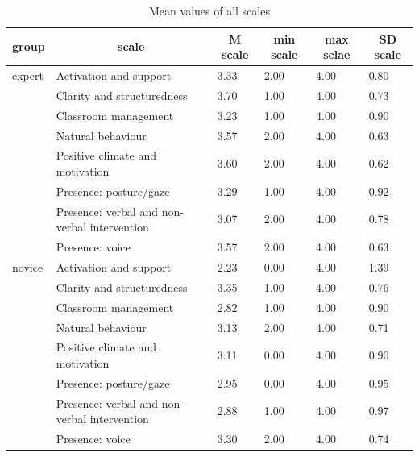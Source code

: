 \documentclass[
  english,
  man,floatsintext]{apa6}
\begin{document}
\begin{table}[h]

\begin{center}
\begin{threeparttable}

\caption{\label{tab:table all scales}Mean values of all scales}

\small{

\begin{tabular}{llllll}
\toprule
group & \multicolumn{1}{c}{scale} & \multicolumn{1}{c}{M scale} & \multicolumn{1}{c}{min scale} & \multicolumn{1}{c}{max sclae} & \multicolumn{1}{c}{SD scale}\\
\midrule
expert & Activation and support & 3.33 & 2.00 & 4.00 & 0.80\\
 & Clarity and structuredness & 3.70 & 1.00 & 4.00 & 0.73\\
 & Classroom management & 3.23 & 1.00 & 4.00 & 0.90\\
 & Natural behaviour & 3.57 & 2.00 & 4.00 & 0.63\\
 & Positive climate and motivation & 3.60 & 2.00 & 4.00 & 0.62\\
 & Presence: posture/gaze & 3.29 & 1.00 & 4.00 & 0.92\\
 & Presence: verbal and non-verbal intervention & 3.07 & 2.00 & 4.00 & 0.78\\
 & Presence: voice & 3.57 & 2.00 & 4.00 & 0.63\\
novice & Activation and support & 2.23 & 0.00 & 4.00 & 1.39\\
 & Clarity and structuredness & 3.35 & 1.00 & 4.00 & 0.76\\
 & Classroom management & 2.82 & 1.00 & 4.00 & 0.90\\
 & Natural behaviour & 3.13 & 2.00 & 4.00 & 0.71\\
 & Positive climate and motivation & 3.11 & 0.00 & 4.00 & 0.90\\
 & Presence: posture/gaze & 2.95 & 0.00 & 4.00 & 0.95\\
 & Presence: verbal and non-verbal intervention & 2.88 & 1.00 & 4.00 & 0.97\\
 & Presence: voice & 3.30 & 2.00 & 4.00 & 0.74\\
\bottomrule
\end{tabular}

}

\end{threeparttable}
\end{center}

\end{table}
\end{document}
